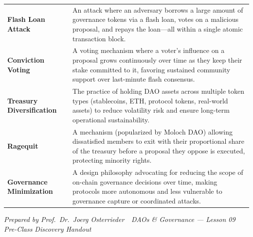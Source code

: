 \documentclass[11pt,a4paper]{article}
\begin{document}
\begin{tabular}{@{}p{3.6cm}p{11.0cm}@{}}
\textbf{Flash Loan Attack}          & An attack where an adversary borrows a large amount of governance tokens via a flash loan, votes on a malicious proposal, and repays the loan---all within a single atomic transaction block. \\
\textbf{Conviction Voting}          & A voting mechanism where a voter's influence on a proposal grows continuously over time as they keep their stake committed to it, favoring sustained community support over last-minute flash consensus. \\
\textbf{Treasury Diversification}   & The practice of holding DAO assets across multiple token types (stablecoins, ETH, protocol tokens, real-world assets) to reduce volatility risk and ensure long-term operational sustainability. \\
\textbf{Ragequit}                   & A mechanism (popularized by Moloch DAO) allowing dissatisfied members to exit with their proportional share of the treasury before a proposal they oppose is executed, protecting minority rights. \\
\textbf{Governance Minimization}    & A design philosophy advocating for reducing the scope of on-chain governance decisions over time, making protocols more autonomous and less vulnerable to governance capture or coordinated attacks. \\
\bottomrule
\end{tabular}

\vspace{6pt}
\noindent\textcolor{mlgray}{\small\textit{Prepared by Prof.\ Dr.\ Joerg Osterrieder \,\textbullet\, DAOs \& Governance --- Lesson 09 \,\textbullet\, Pre-Class Discovery Handout}}
\end{document}
